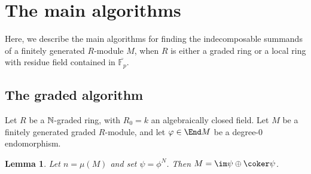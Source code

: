 \documentclass[12pt]{article}
\let\b\beta
\theoremstyle{theorem}
\numberwithin{thm}{section}
\newtheorem{lem}[thm]{Lemma}
\theoremstyle{definition}
\begin{document}
\section{The main algorithms} 
Here, we describe the main algorithms for finding the indecomposable summands of a finitely generated $R$-module $M$, when $R$ is either a graded ring or a local ring with residue field contained in $\overline{\mathbb F_p}$.

\subsection{The graded algorithm}\label{sec:main-alg-new}
Let $R$ be a $\mathbb N$-graded ring, with $R_0=k$ an algebraically closed field.
Let $M$ be a finitely generated graded $R$-module, and let $\phi \in \End M$ be a degree-0 endomorphism.






\begin{lem}
\label{graded_algorithm}
Let $n=\mu(M)$ and set $\psi=\phi^N$. Then $M=\im \psi \oplus \coker \psi$.
\end{lem}
\end{document}
